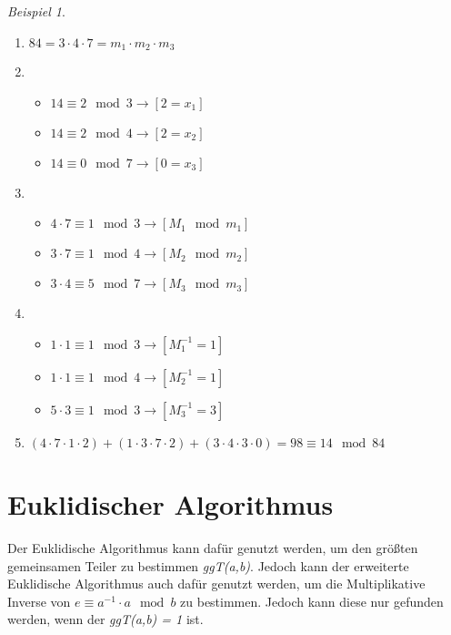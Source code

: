 \documentclass{scrreprt}
\theoremstyle{remark}
\newtheorem{beispiel}[definition]{Beispiel}
\begin{document}
\begin{beispiel}
  \begin{enumerate}
    \hfill
  \item $84 = 3\cdot4\cdot7 = m_{1}\cdot m_{2} \cdot m_{3}$
  \item
    \begin{itemize}
    \item $14 \equiv 2 \mod 3\rightarrow [2 = x_{1}]$
    \item $14 \equiv 2 \mod 4\rightarrow [2 = x_{2}]$
    \item $14 \equiv 0 \mod 7\rightarrow [0 = x_{3}]$
    \end{itemize}
  \item
    \begin{itemize}
    \item $4\cdot 7\equiv 1 \mod{3} \rightarrow [M_{1}\mod{m_{1}}]$
    \item $3\cdot 7\equiv 1 \mod{4} \rightarrow [M_{2}\mod{m_{2}}]$
    \item $3\cdot 4\equiv 5 \mod{7} \rightarrow [M_{3}\mod{m_{3}}]$
    \end{itemize}
  \item
    \begin{itemize}
      \item $1\cdot1\equiv 1 \mod{3} \rightarrow [M_{1}^{-1} = 1]$ 
      \item $1\cdot1\equiv 1 \mod{4} \rightarrow [M_{2}^{-1} = 1]$
      \item $5\cdot3\equiv 1 \mod{3} \rightarrow [M_{3}^{-1} = 3]$ 
    \end{itemize}
    \item $(4\cdot7\cdot1\cdot2)+(1\cdot3\cdot7\cdot2)+(3\cdot4\cdot3\cdot0) = \boxed{98\equiv14 \mod{84}}$
  \end{enumerate}
\end{beispiel}
\chapter{Euklidischer Algorithmus}
Der Euklidische Algorithmus kann dafür genutzt werden, um den größten gemeinsamen Teiler zu bestimmen \textit{ggT(a,b)}. Jedoch kann der erweiterte Euklidische Algorithmus auch dafür genutzt werden, um die Multiplikative Inverse von $ e \equiv a^{-1}\cdot a \mod{b} $ zu bestimmen. Jedoch kann diese nur gefunden werden, wenn der \textit{ggT(a,b) = 1} ist.
\end{document}
